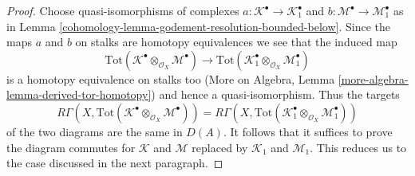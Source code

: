 \begin{proof}

Choose quasi-isomorphisms of complexes
$a : \mathcal{K}^\bullet \to \mathcal{K}_1^\bullet$ and
$b : \mathcal{M}^\bullet \to \mathcal{M}_1^\bullet$
as in Lemma \ref{cohomology-lemma-godement-resolution-bounded-below}.
Since the maps $a$ and $b$ on stalks are homotopy equivalences
we see that the induced map
$$
\text{Tot}(\mathcal{K}^\bullet \otimes_{\mathcal{O}_X} \mathcal{M}^\bullet)
\to
\text{Tot}(\mathcal{K}_1^\bullet \otimes_{\mathcal{O}_X} \mathcal{M}_1^\bullet)
$$
is a homotopy equivalence on stalks too (More on Algebra, Lemma
\ref{more-algebra-lemma-derived-tor-homotopy}) and hence a quasi-isomorphism.
Thus the targets
$$
R\Gamma(X,
\text{Tot}(\mathcal{K}^\bullet
\otimes_{\mathcal{O}_X} \mathcal{M}^\bullet)) =
R\Gamma(X,
\text{Tot}(\mathcal{K}_1^\bullet
\otimes_{\mathcal{O}_X} \mathcal{M}_1^\bullet))
$$
of the two diagrams are the same in $D(A)$. It follows that it suffices
to prove the diagram commutes for $\mathcal{K}$ and $\mathcal{M}$
replaced by $\mathcal{K}_1$ and $\mathcal{M}_1$. This reduces us to
the case discussed in the next paragraph.


\end{proof}
